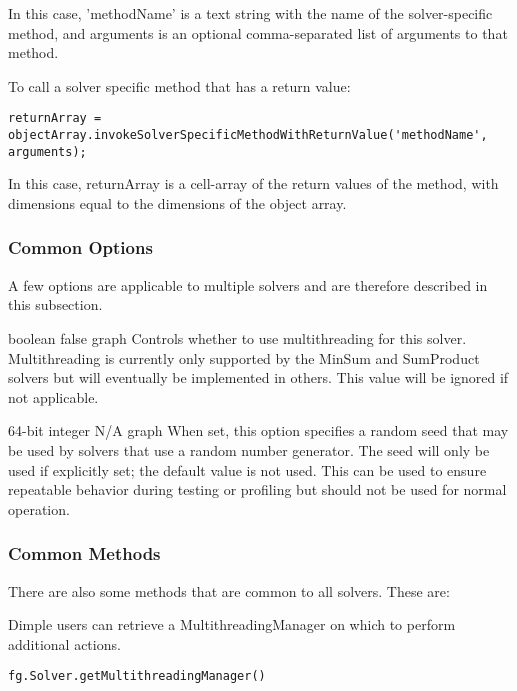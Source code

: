In this case, 'methodName' is a text string with the name of the solver-specific method, and arguments is an optional comma-separated list of arguments to that method.

To call a solver specific method that has a return value:
\begin{lstlisting}
returnArray = objectArray.invokeSolverSpecificMethodWithReturnValue('methodName', arguments);
\end{lstlisting}

In this case, returnArray is a cell-array of the return values of the method, with dimensions equal to the dimensions of the object array.

\fi

\subsubsection{Common Options}

A few options are applicable to multiple solvers and are therefore described in this subsection.


{boolean}
{false}
{graph}
{Controls whether to use multithreading for this solver. Multithreading is currently only supported by the MinSum and SumProduct solvers but will eventually be implemented in others. This value will be ignored if not applicable.}


{64-bit integer}
{N/A}
{graph}
{When set, this option specifies a random seed that may be used by solvers that use a random number generator. The seed will only be used if explicitly set; the default value is not used. This can be used to ensure repeatable behavior during testing or profiling but should not be used for normal operation.}

\subsubsection{Common Methods}

There are also some methods that are common to all solvers. These are:


Dimple users can retrieve a MultithreadingManager on which to perform additional actions.

\ifmatlab
\begin{lstlisting}
fg.Solver.getMultithreadingManager()
\end{lstlisting}
\fi

